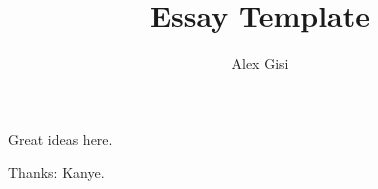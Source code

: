 \documentclass[11pt]{article}
\title{\vspace{-1cm}Essay Template}
\author{Alex Gisi}
\begin{document}
\maketitle

Great ideas here.

\vspace{10mm}
\noindent Thanks: Kanye.
\end{document}
